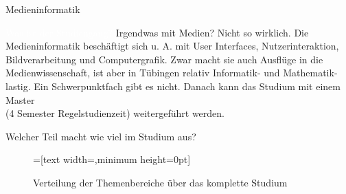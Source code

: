 
\begin{Huge}
    Medieninformatik
\end{Huge}

\begin{exampleblock}{\textcolor{white}{Was ist der Studiengang?}}
    Irgendwas mit Medien? Nicht so wirklich. Die Medieninformatik beschäftigt sich u. A. mit User Interfaces, Nutzerinteraktion, Bildverarbeitung und Computergrafik. Zwar macht sie auch Ausflüge in die Medienwissenschaft, ist aber in Tübingen relativ Informatik- und Mathematik-lastig. Ein Schwerpunktfach gibt es nicht. Danach kann das Studium mit einem Master \\ (4 Semester Regelstudienzeit) weitergeführt werden.
\end{exampleblock}

\begin{block}{Welcher Teil macht wie viel im Studium aus?}
    \begin{figure}[h!]
        \vspace{-10pt}
        \begin{minipage}{\linewidth}
            \centering
            =[text width={},minimum height=0pt]
        \end{minipage}
        \caption{Verteilung der Themenbereiche über das komplette Studium}
    \end{figure}
\end{block}

